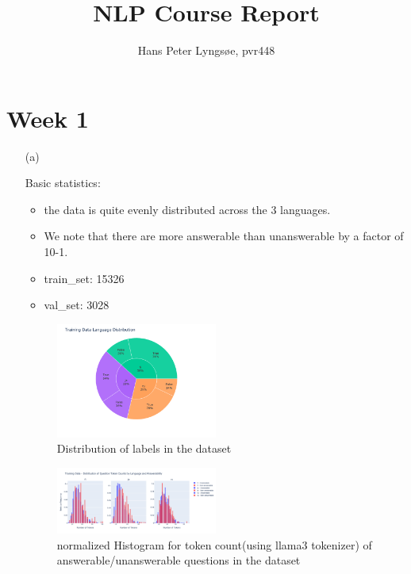 \documentclass[11pt]{article}
\begin{document}
\title{NLP Course Report}
\author{Hans Peter Lyngsøe, pvr448}

\maketitle

\section{Week 1}
\begin{enumerate}
    \item[(a)] 

    Basic statistics:
    \begin{itemize}
        \item the data is quite evenly distributed across the 3 languages.
        \item We note that there are more answerable than unanswerable by a factor of 10-1.
        \item train\_set: 15326
        \item val\_set: 3028
    \end{itemize}

    \begin{figure}[ht]
        \centering
        \includegraphics[width=0.5\textwidth]{week1_a_dataset.png}
        \caption{Distribution of labels in the dataset}
        \label{fig:label_distribution}
    \end{figure}

    \begin{figure}[ht]
        \centering
        \includegraphics[width=0.5\textwidth]{week1_a_lang_token_distribution_normalized.png}
        \caption{normalized Histogram for token count(using llama3 tokenizer) of answerable/unanswerable questions in the dataset}
        \label{fig:language_distribution}
    \end{figure}


\end{enumerate}
\end{document}
